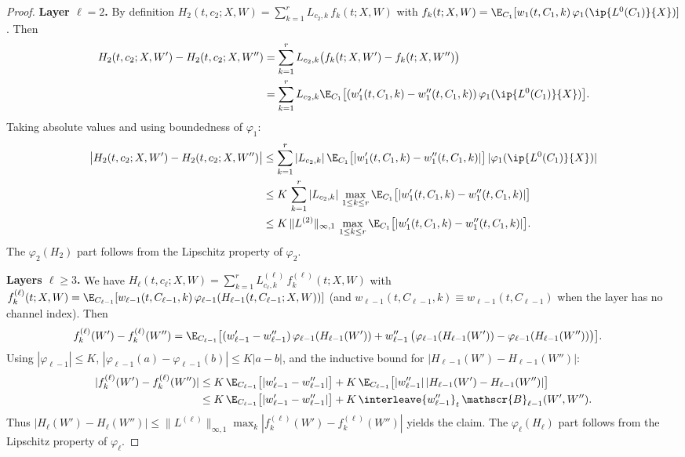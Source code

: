 \documentclass[nohyperref]{article}
\theoremstyle{plain}
\theoremstyle{definition}
\theoremstyle{remark}
\begin{document}
\begin{proof}
\textbf{Layer $\ell=2$.}
By definition $H_2(t,c_2;X,W)=\sum_{k=1}^r L_{c_2,k}\,f_k(t;X,W)$ with $f_k(t;X,W)=\E_{C_1}[w_1(t,C_1,k)\,\varphi_1(\ip{L^0(C_1)}{X})]$. Then
\begin{align*}
H_2(t,c_2;X,W')-H_2(t,c_2;X,W'') &= \sum_{k=1}^r L_{c_2,k}\big(f_k(t;X,W')-f_k(t;X,W'')\big)\\
&= \sum_{k=1}^r L_{c_2,k}\E_{C_1}\big[(w_1'(t,C_1,k)-w_1''(t,C_1,k))\,\varphi_1(\ip{L^0(C_1)}{X})\big].
\end{align*}
Taking absolute values and using boundedness of $\varphi_1$:
\begin{align*}
\big|H_2(t,c_2;X,W')-H_2(t,c_2;X,W'')\big| &\le \sum_{k=1}^r |L_{c_2,k}|\,\E_{C_1}\big[|w_1'(t,C_1,k)-w_1''(t,C_1,k)|\big]\,|\varphi_1(\ip{L^0(C_1)}{X})|\\
&\le K\,\sum_{k=1}^r |L_{c_2,k}|\,\max_{1\le k\le r}\E_{C_1}\big[|w_1'(t,C_1,k)-w_1''(t,C_1,k)|\big]\\
&\le K\,\|L^{(2)}\|_{\infty,1}\,\max_{1\le k\le r}\E_{C_1}\big[|w_1'(t,C_1,k)-w_1''(t,C_1,k)|\big].
\end{align*}
The $\varphi_2(H_2)$ part follows from the Lipschitz property of $\varphi_2$.

\textbf{Layers $\ell\ge 3$.}
We have $H_\ell(t,c_\ell;X,W)=\sum_{k=1}^r L^{(\ell)}_{c_\ell,k}\,f_k^{(\ell)}(t;X,W)$ with
$f_k^{(\ell)}(t;X,W)=\E_{C_{\ell-1}}[w_{\ell-1}(t,C_{\ell-1},k)\,\varphi_{\ell-1}(H_{\ell-1}(t,C_{\ell-1};X,W))]$
(and $w_{\ell-1}(t,C_{\ell-1},k)\equiv w_{\ell-1}(t,C_{\ell-1})$ when the layer has no channel index). Then
\begin{align*}
f_k^{(\ell)}(W')-f_k^{(\ell)}(W'')
&=\E_{C_{\ell-1}}\big[(w_{\ell-1}'-w_{\ell-1}'')\,\varphi_{\ell-1}(H_{\ell-1}(W'))
+w_{\ell-1}''\,\big(\varphi_{\ell-1}(H_{\ell-1}(W'))-\varphi_{\ell-1}(H_{\ell-1}(W''))\big)\big].
\end{align*}
Using $|\varphi_{\ell-1}|\le K$, $|\varphi_{\ell-1}(a)-\varphi_{\ell-1}(b)|\le K|a-b|$, and the inductive bound for $|H_{\ell-1}(W')-H_{\ell-1}(W'')|$:
\begin{align*}
|f_k^{(\ell)}(W')-f_k^{(\ell)}(W'')|
&\le K\,\E_{C_{\ell-1}}\big[|w_{\ell-1}'-w_{\ell-1}''|\big]
+K\,\E_{C_{\ell-1}}\big[|w_{\ell-1}''|\,|H_{\ell-1}(W')-H_{\ell-1}(W'')|\big]\\
&\le K\,\E_{C_{\ell-1}}\big[|w_{\ell-1}'-w_{\ell-1}''|\big]
+K\,{\interleave{w_{\ell-1}''}}_t\,\mathscr{B}_{\ell-1}(W',W'').
\end{align*}
Thus $|H_\ell(W')-H_\ell(W'')|\le \|L^{(\ell)}\|_{\infty,1}\max_k|f_k^{(\ell)}(W')-f_k^{(\ell)}(W'')|$ yields the claim. The $\varphi_\ell(H_\ell)$ part follows from the Lipschitz property of $\varphi_\ell$.
\end{proof}
\end{document}
